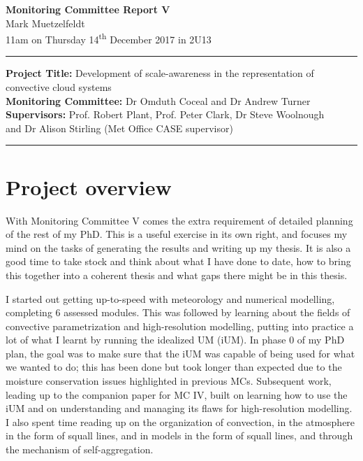 \documentclass[11pt,a4paper]{article}
\newcommand{\ts}{\textsuperscript}
\begin{document}

\begin{center}
    \Large{\textbf{Monitoring Committee Report V}}\\[0.1cm]
    \large{Mark Muetzelfeldt}\\
    \normalsize{11am on Thursday 14\ts{th} December 2017 in 2U13}\\[0.1cm]		
    \rule{\textwidth}{0.2mm}
    \textbf{Project Title: }Development of scale-awareness in the representation of
    convective cloud systems\\
    \textbf{Monitoring Committee: }Dr Omduth Coceal and  Dr Andrew Turner\\
    \textbf{Supervisors: }Prof. Robert Plant, Prof. Peter Clark, Dr Steve Woolnough \\
    and Dr Alison Stirling (Met Office CASE supervisor)\\
    \rule{\textwidth}{0.2mm}
\end{center}

\section{Project overview}
\label{sec:Project Overview}

With Monitoring Committee V comes the extra requirement of detailed planning of the rest of my PhD. This is a useful exercise in its own right, and focuses my mind on the tasks of generating the results and writing up my thesis. It is also a good time to take stock and think about what I have done to date, how to bring this together into a coherent thesis and what gaps there might be in this thesis.

I started out getting up-to-speed with meteorology and numerical modelling, completing 6 assessed modules. This was followed by learning about the fields of convective parametrization and high-resolution modelling, putting into practice a lot of what I learnt by running the idealized UM (iUM). In phase 0 of my PhD plan, the goal was to make sure that the iUM was capable of being used for what we wanted to do; this has been done but took longer than expected due to the moisture conservation issues highlighted in previous MCs. Subsequent work, leading up to the companion paper for MC IV, built on learning how to use the iUM and on understanding and managing its flaws for high-resolution modelling. I also spent time reading up on the organization of convection, in the atmosphere in the form of squall lines, and in models in the form of squall lines, and through the mechanism of self-aggregation.
\end{document}
